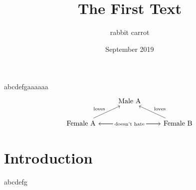 \documentclass{article}
\title{The First Text}
\author{rabbit carrot}
\date{September 2019}
\begin{document}
\maketitle
{\Huge abcdefg}aaaaaa
$$
\begin{tikzcd}
 {}   & \text{Male A} &{}\\
\text{Female A} \arrow[rr] \arrow[ru, "\text{loves}"] & {}              & \text{Female B} \arrow[ll, "\text{doesn't hate}" description] \arrow[lu, "\text{loves}"']
\end{tikzcd}
$$


\section{Introduction}
abcdefg
\end{document}
